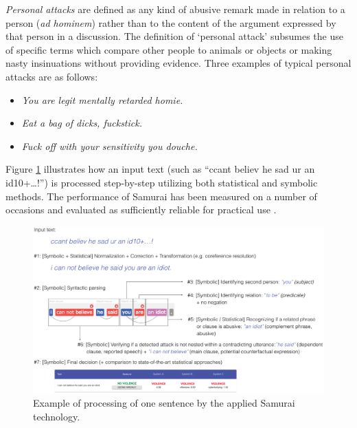 \documentclass[preprint,12pt]{elsarticle}
\begin{document}
\textit{Personal attacks} are defined as any
kind of abusive remark made in relation to a person
(\textit{ad hominem}) rather than to the content of the argument
expressed by that person in a discussion. The definition of `personal
attack' subsumes the use of specific terms which compare other people to
animals or objects or making nasty insinuations without providing
evidence. Three examples of typical personal attacks are as follows:

\begin{itemize} 
\item \emph{You are legit mentally retarded homie.}
\item \emph {Eat a bag of dicks, fuckstick.}
\item \emph {Fuck off with your sensitivity you douche.} 
\end{itemize}



Figure \ref{fig:samuraiexample} illustrates how an  input text (such as ``ccant
believ he sad ur an id10+\ldots!'') is processed step-by-step utilizing
both statistical and symbolic methods. The performance of Samurai has been measured on a number of occasions and evaluated as sufficiently reliable for practical use \citep{ptaszynski2018cyberbullying,ijerph182211759,urbaniak2022personal,URBANIAK2022107371}.

\begin{figure}[t]
    \centering
    \includegraphics[width=\linewidth]{example.eps}
    \caption{Example of processing of one sentence by the applied Samurai technology.}
    \label{fig:samuraiexample}
\end{figure}

\end{document}
